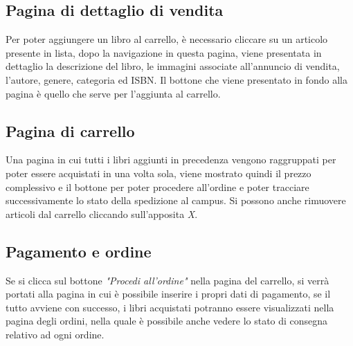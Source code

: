 \documentclass[a4paper]{report}
\begin{document}
	\subsection{Pagina di dettaglio di vendita} \label{ss:dettvend}
	Per poter aggiungere un libro al carrello, è necessario cliccare su un articolo presente in lista, dopo la navigazione in questa pagina, viene presentata in dettaglio la descrizione del libro, le immagini associate all'annuncio di vendita, l'autore, genere, categoria ed ISBN. Il bottone che viene presentato in fondo alla pagina è quello che serve per l'aggiunta al carrello.
	\subsection{Pagina di carrello}
	Una pagina in cui tutti i libri aggiunti in precedenza vengono raggruppati per poter essere acquistati in una volta sola, viene mostrato quindi il prezzo complessivo e il bottone per poter procedere all'ordine e poter tracciare successivamente lo stato della spedizione al campus. Si possono anche rimuovere articoli dal carrello cliccando sull'apposita \textit{X}.
	\subsection{Pagamento e ordine}
	Se si clicca sul bottone \textit{"Procedi all'ordine"} nella pagina del carrello, si verrà portati alla pagina in cui è possibile inserire i propri dati di pagamento, se il tutto avviene con successo, i libri acquistati potranno essere visualizzati nella pagina degli ordini, nella quale è possibile anche vedere lo stato di consegna relativo ad ogni ordine.
\end{document}
